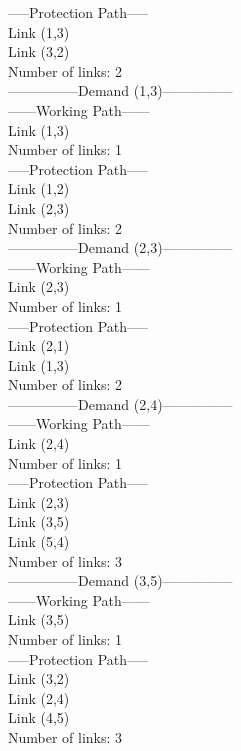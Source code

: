 -----Protection Path----- \\
Link  (1,3) \\
Link  (3,2) \\
Number of links: 2 \\

---------------Demand (1,3)--------------- \\

------Working Path------ \\
Link  (1,3) \\
Number of links: 1 \\

-----Protection Path----- \\
Link  (1,2) \\
Link  (2,3) \\
Number of links: 2 \\

---------------Demand (2,3)--------------- \\

------Working Path------ \\
Link  (2,3) \\
Number of links: 1 \\

-----Protection Path----- \\
Link  (2,1) \\
Link  (1,3) \\
Number of links: 2 \\

---------------Demand (2,4)--------------- \\

------Working Path------ \\
Link  (2,4) \\
Number of links: 1 \\

-----Protection Path----- \\
Link  (2,3) \\
Link  (3,5) \\
Link  (5,4) \\
Number of links: 3 \\

---------------Demand (3,5)--------------- \\

------Working Path------ \\
Link  (3,5) \\
Number of links: 1 \\

-----Protection Path----- \\
Link  (3,2) \\
Link  (2,4) \\
Link  (4,5) \\
Number of links: 3 \\


